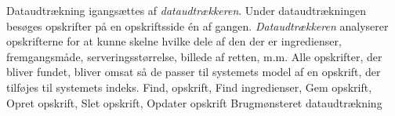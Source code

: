 {Dataudtrækning igangsættes af \textit{dataudtrækkeren}. Under dataudtrækningen besøges opskrifter på en opskriftsside én af gangen. \textit{Dataudtrækkeren} analyserer opskrifterne for at kunne skelne hvilke dele af den der er ingredienser, fremgangsmåde, serveringsstørrelse, billede af retten, m.m. Alle opskrifter, der bliver fundet, bliver omsat så de passer til systemets model af en opskrift, der tilføjes til systemets indeks.}
{}
{Find, opskrift, Find ingredienser, Gem opskrift, Opret opskrift, Slet opskrift, Opdater opskrift}
{Brugmønsteret dataudtrækning}